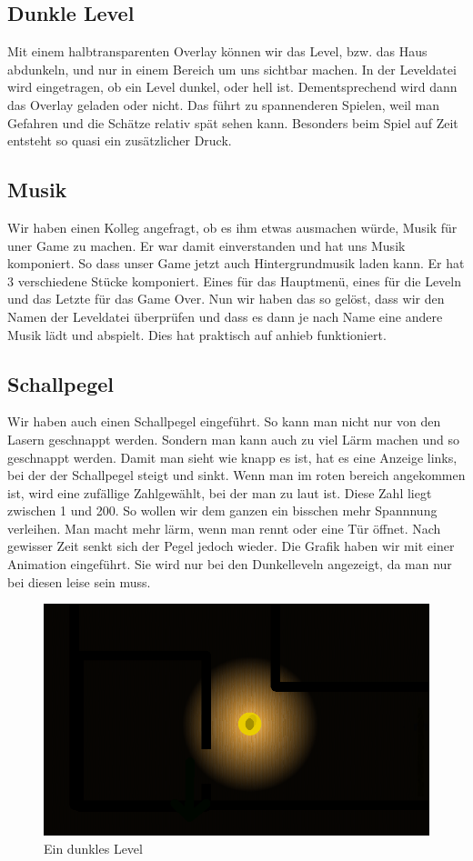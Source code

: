 \documentclass[11pt,a4paper]{scrbook}
\begin{document}
 	
\subsection{Dunkle Level} 	
Mit einem halbtransparenten Overlay können wir das Level, bzw. das Haus abdunkeln, und nur in einem Bereich um uns 	
sichtbar machen. In der Leveldatei wird eingetragen, ob ein Level dunkel, oder hell ist. Dementsprechend wird dann das 	
Overlay geladen oder nicht. Das führt zu spannenderen Spielen, weil man Gefahren und die Schätze relativ spät sehen kann. 	
Besonders beim Spiel auf Zeit entsteht so quasi ein zusätzlicher Druck. 	
 	
\subsection{Musik} 	
Wir haben einen Kolleg angefragt, ob es ihm etwas ausmachen würde, Musik für uner Game zu machen. Er war damit einverstanden und hat uns Musik komponiert. So dass unser Game jetzt auch Hintergrundmusik laden kann. Er hat 3 verschiedene Stücke komponiert. Eines für das Hauptmenü, eines für die Leveln und das Letzte für das Game Over. Nun wir haben das so gelöst, dass wir den Namen der Leveldatei überprüfen und dass es dann je nach Name eine andere Musik lädt und abspielt. Dies hat praktisch auf anhieb funktioniert. 	
	
\subsection{Schallpegel} 	
Wir haben auch einen Schallpegel eingeführt. So kann man nicht nur von den Lasern geschnappt werden. Sondern man kann auch zu viel Lärm machen und so geschnappt werden. Damit man sieht wie knapp es ist, hat es eine Anzeige links, bei der der Schallpegel steigt und sinkt. Wenn man im roten bereich angekommen ist, wird eine zufällige Zahlgewählt, bei der man zu laut ist. Diese Zahl liegt zwischen 1 und 200. So wollen wir dem ganzen ein bisschen mehr Spannnung verleihen. Man macht mehr lärm, wenn man rennt oder eine Tür öffnet. Nach gewisser Zeit senkt sich der Pegel jedoch wieder. Die Grafik haben wir mit einer Animation eingeführt. Sie wird nur bei den Dunkelleveln angezeigt, da man nur bei diesen leise sein muss.
 	
\begin{figure}[h] 	
\centering 	
\includegraphics[scale=0.5]{img/dunkel.png} 	
\caption{Ein dunkles Level} 	
\end{figure} 	
 	
\end{document}
